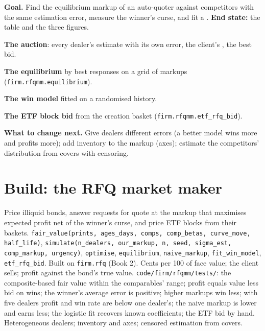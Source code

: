 \begin{tutorial}
\textbf{Goal.} Find the equilibrium markup of an auto-quoter against competitors with the same estimation error, measure the winner's curse, and fit
a . \textbf{End state:} the table and the three figures.
\begin{tutsteps}
\item \textbf{The auction}: every dealer's estimate with its own error, the client's , the best bid.
\label{lst:hf:bond-and-etf-request-for-quote-market-making:sim}
\item \textbf{The equilibrium} by best responses on a grid of markups (\texttt{firm.rfqmm.equilibrium}).
\item \textbf{The win model} fitted on a randomised history.
\label{lst:hf:bond-and-etf-request-for-quote-market-making:win}
\item \textbf{The ETF block bid} from the creation basket (\texttt{firm.rfqmm.etf\_rfq\_bid}).
\end{tutsteps}
\textbf{What to change next.} Give dealers different errors (a better model wins more and profits more); add inventory to the markup (axes);
estimate the competitors' distribution from covers with censoring.
\end{tutorial}

\section{Build: the RFQ market maker}\label{bld:hf:bond-and-etf-request-for-quote-market-making:rfqmm}

\begin{build}
 Price illiquid bonds, answer requests for quote at the markup that maximises expected profit net of the winner's curse, and price ETF
blocks from their baskets.
 \texttt{fair\_value(prints, ages\_days, comps, comp\_betas, curve\_move, half\_life)}, \texttt{simulate(n\_dealers, our\_markup, n,
seed, sigma\_est, comp\_markup, urgency)}, \texttt{optimise}, \texttt{equilibrium}, \texttt{naive\_markup}, \texttt{fit\_win\_model},
\texttt{etf\_rfq\_bid}. Built on \texttt{firm.rfq} (Book 2).
 Cents per 100 of face value; the client sells; profit against the bond's true value.
 \texttt{code/firm/rfqmm/tests/}: the composite-based fair value within the comparables' range; profit equals value less bid on
wins; the winner's average error is positive; higher markups win less; with five dealers profit and win rate are below one dealer's; the naive
markup is lower and earns less; the logistic fit recovers known coefficients; the ETF bid by hand.
 Heterogeneous dealers; inventory and axes; censored estimation from covers.
\end{build}

